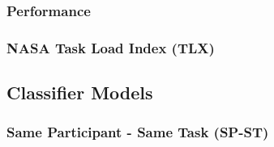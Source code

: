 \documentclass[11pt]{article}
\begin{document}
		\subsubsection{Performance}
		\begin{figure}
		\centering
		\caption{}
		\label{fig:matb-perf}
		\end{figure} 
		
		\begin{figure}
		\centering
		\caption{}
		\label{fig:rantask-perf}
		\end{figure} 
		
		
		
		\subsubsection{NASA Task Load Index (TLX)}
		\begin{figure}
		\centering
		\caption{}
		\label{fig:matb-tlx}
		\end{figure} 
		
		\begin{figure}
		\centering
		\caption{}
		\label{fig:rantask-tlx}
		\end{figure} 
		
		
	\subsection{Classifier Models}
	
		\subsubsection{Same Participant - Same Task (SP-ST)}
		\begin{figure}
		\centering
		\caption{}
		\label{fig:sp-st}
		\end{figure} 
		
\end{document}
